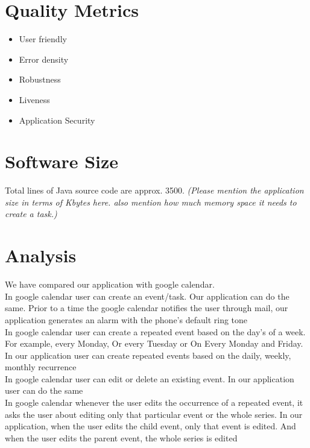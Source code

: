 \documentclass[10pt,a4paper]{report}
\begin{document}
\section{Quality Metrics}

\begin{itemize}
 \item User friendly
 \item Error density
 \item Robustness
 \item Liveness
 \item Application Security
\end{itemize}

\section{Software Size}

Total lines of Java source code are approx. 3500. \textit{\color{red}(Please mention the application size in terms of Kbytes here. also mention how much memory space it needs to create a task.)}

\section{Analysis}

We have compared our application with google calendar.\\

In google calendar user can create an event/task. Our application can do the same.
Prior to a time the google calendar notifies the user through mail, our application generates an alarm with the phone's default ring tone \\

In google calendar user can create a repeated event based on the day's of a week. For example, every Monday, Or every Tuesday or On Every Monday and Friday. In our application user can create repeated events based on the daily, weekly, monthly recurrence \\

In google calendar user can edit or delete an existing event. In our application user can do the same\\

In google calendar whenever the user edits the occurrence of a repeated event, it asks the user about editing only that particular event or the whole series. In our application, when the user edits the child event, only that event is edited. And when the user edits the parent event, the whole series is edited \\
\end{document}

